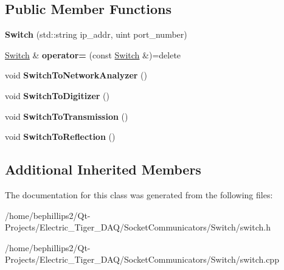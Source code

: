 \subsection*{Public Member Functions}
\begin{DoxyCompactItemize}
\item 
{\bfseries Switch} (std\+::string ip\+\_\+addr, uint port\+\_\+number)\hypertarget{class_switch_a8075f9eb1d911ee97166f9d6c424b766}{}\label{class_switch_a8075f9eb1d911ee97166f9d6c424b766}

\item 
\hyperlink{class_switch}{Switch} \& {\bfseries operator=} (const \hyperlink{class_switch}{Switch} \&)=delete\hypertarget{class_switch_a5d75382f2acb13883c3ef60d8b2aef7d}{}\label{class_switch_a5d75382f2acb13883c3ef60d8b2aef7d}

\item 
void {\bfseries Switch\+To\+Network\+Analyzer} ()\hypertarget{class_switch_a88b6be045896b8946be86202dc4c97e3}{}\label{class_switch_a88b6be045896b8946be86202dc4c97e3}

\item 
void {\bfseries Switch\+To\+Digitizer} ()\hypertarget{class_switch_a004bbaf7459b48549f87f7b26e9353ed}{}\label{class_switch_a004bbaf7459b48549f87f7b26e9353ed}

\item 
void {\bfseries Switch\+To\+Transmission} ()\hypertarget{class_switch_a9671dbed18c34b5e0e4c8961004d150e}{}\label{class_switch_a9671dbed18c34b5e0e4c8961004d150e}

\item 
void {\bfseries Switch\+To\+Reflection} ()\hypertarget{class_switch_abe4a4b4754fdb4979ddfa3a10fc9e127}{}\label{class_switch_abe4a4b4754fdb4979ddfa3a10fc9e127}

\end{DoxyCompactItemize}
\subsection*{Additional Inherited Members}


The documentation for this class was generated from the following files\+:\begin{DoxyCompactItemize}
\item 
/home/bephillips2/\+Qt-\/\+Projects/\+Electric\+\_\+\+Tiger\+\_\+\+D\+A\+Q/\+Socket\+Communicators/\+Switch/switch.\+h\item 
/home/bephillips2/\+Qt-\/\+Projects/\+Electric\+\_\+\+Tiger\+\_\+\+D\+A\+Q/\+Socket\+Communicators/\+Switch/switch.\+cpp\end{DoxyCompactItemize}
